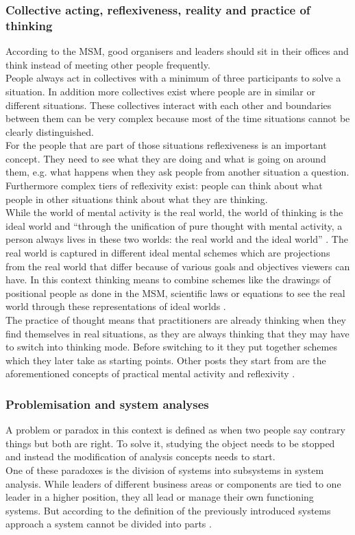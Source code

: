 \documentclass[11pt,a4paper]{article}
\begin{document}
\subsubsection{Collective acting, reflexiveness, reality and practice of thinking}
According to the MSM, good organisers and leaders should sit in their offices and think instead of meeting other people frequently. \\
People always act in collectives with a minimum of three participants to solve a situation. In addition more collectives exist where people are in similar or different situations. These collectives interact with each other and boundaries between them can be very complex because most of the time situations cannot be clearly distinguished. \\
For the people that are part of those situations reflexiveness is an important concept. They need to see what they are doing and what is going on around them, e.g. what happens when they ask people from another situation a question. Furthermore complex tiers of reflexivity exist: people can think about what people in other situations think about what they are thinking. \\
While the world of mental activity is the real world, the world of thinking is the ideal world and “through the unification of pure thought with mental activity, a person always lives in these two worlds: the real world and the ideal world” \cite[p. 67]{MSM}. The real world is captured in different ideal mental schemes which are projections from the real world that differ because of various goals and objectives viewers can have. In this context thinking means to combine schemes like the drawings of positional people as done in the MSM, scientific laws or equations to see the real world through these representations of ideal worlds \cite[p. 56ff.]{MSM}. \\
The practice of thought means that practitioners are already thinking when they find themselves in real situations, as they are always thinking that they may have to switch into thinking mode. Before switching to it they put together schemes which they later take as starting points. Other posts they start from are the aforementioned concepts of practical mental activity and reflexivity \cite[p. 71]{MSM}.

\subsubsection{Problemisation and system analyses}
A problem or paradox in this context is defined as when two people say contrary things but both are right. To solve it, studying the object needs to be stopped and instead the modification of analysis concepts needs to start. \\
One of these paradoxes is the division of systems into subsystems in system analysis. While leaders of different business areas or components are tied to one leader in a higher position, they all lead or manage their own functioning systems. But according to the definition of the previously introduced systems approach a system cannot be divided into parts \cite[p. 78ff.]{MSM}.
\end{document}
